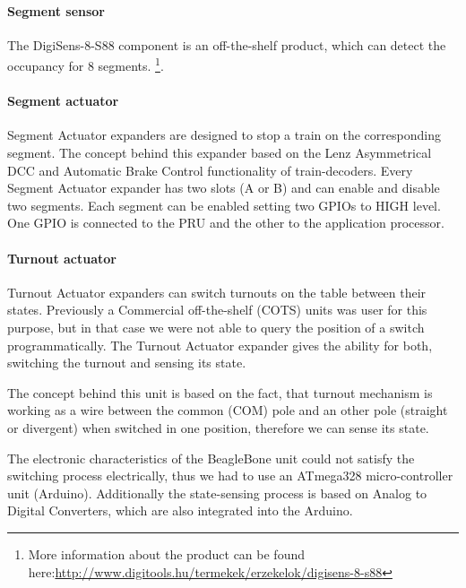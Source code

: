 \paragraph{Segment sensor}\label{par:SegmentSensor}
The DigiSens-8-S88 component is an off-the-shelf product, which can detect the occupancy for 8 segments. \footnote{More information about the product can be found here:\url{http://www.digitools.hu/termekek/erzekelok/digisens-8-s88}}.

\paragraph{Segment actuator}
Segment Actuator expanders are designed to stop a train on the corresponding segment. The concept behind this expander based on the Lenz Asymmetrical DCC and Automatic Brake Control functionality of train-decoders. Every Segment Actuator expander has two slots (A or B) and can enable and disable two segments. Each segment can be enabled setting two GPIOs to HIGH level. One GPIO is connected to the PRU and the other to the application processor.

\paragraph{Turnout actuator}
Turnout Actuator expanders can switch turnouts on the table between their states. Previously a Commercial off-the-shelf (COTS) units was user for this purpose, but in that case we were not able to query the position of a switch programmatically. The Turnout Actuator expander gives the ability for both, switching the turnout and sensing its state.

The concept behind this unit is based on the fact, that turnout mechanism is working as a wire between the common (COM) pole and an other pole (straight or divergent) when switched in one position, therefore we can sense its state.

The electronic characteristics of the BeagleBone unit could not satisfy the switching process electrically, thus we had to use an ATmega328 micro-controller unit (Arduino). Additionally the state-sensing process is based on Analog to Digital Converters, which are also integrated into the Arduino.

